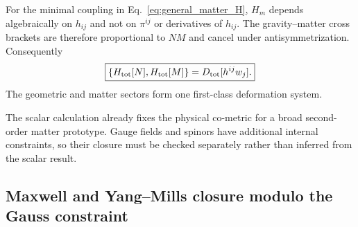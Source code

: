 \documentclass[11pt]{article}
\begin{document}
For the minimal coupling in Eq.~\eqref{eq:general_matter_H}, $H_m$ depends algebraically on $h_{ij}$ and not on $\pi^{ij}$ or derivatives of $h_{ij}$. The gravity--matter cross brackets are therefore proportional to $NM$ and cancel under antisymmetrization. Consequently
\begin{equation}
\boxed{
\{H_{\rm tot}[N],H_{\rm tot}[M]\}
=D_{\rm tot}[h^{ij}w_j].}
\label{eq:total_HDA_matter}
\end{equation}
The geometric and matter sectors form one first-class deformation system.

The scalar calculation already fixes the physical co-metric for a broad second-order matter prototype. Gauge fields and spinors have additional internal constraints, so their closure must be checked separately rather than inferred from the scalar result.

\subsection{Maxwell and Yang--Mills closure modulo the Gauss constraint}
\label{subsec:YM_closure}
\end{document}
